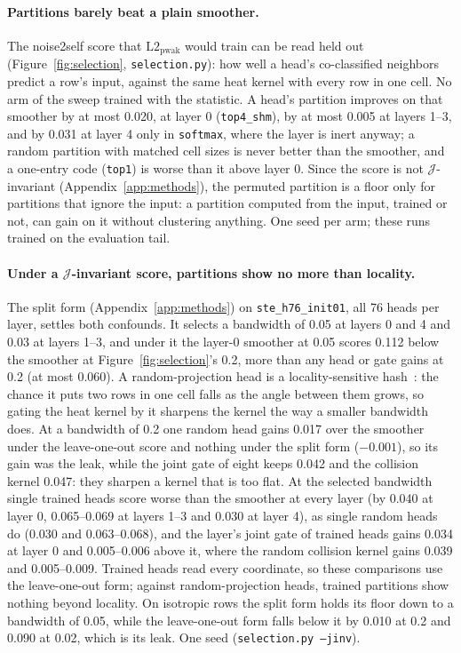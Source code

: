 \paragraph{Partitions barely beat a plain smoother.} The noise2self score
that $\mathrm{L2}_{\mathrm{pwak}}$ would train can be read held out
(Figure~\ref{fig:selection}, \texttt{selection.py}): how well a head's
co-classified neighbors predict a row's input, against the same heat
kernel with every row in one cell. No arm of the sweep trained with the
statistic. A head's partition improves on that smoother by at most 0.020,
at layer 0 (\texttt{top4\_shm}), by at most 0.005 at layers 1--3, and by
0.031 at layer 4 only in \texttt{softmax}, where the layer is inert
anyway; a random partition with matched cell sizes is never better than
the smoother, and a one-entry code (\texttt{top1}) is worse than it above
layer 0. Since the score is not $\mathcal{J}$-invariant (Appendix~\ref{app:methods}),
the permuted partition is a floor only for partitions that ignore the
input: a partition computed from the input, trained or not, can gain on
it without clustering anything. One seed per arm; these runs trained on
the evaluation tail.

\paragraph{Under a $\mathcal{J}$-invariant score, partitions show no more
than locality.} The split form (Appendix~\ref{app:methods}) on
\texttt{ste\_h76\_init01}, all 76 heads per layer, settles both
confounds. It selects a bandwidth of 0.05 at layers 0 and 4 and 0.03 at
layers 1--3, and under it the layer-0 smoother at 0.05 scores 0.112
below the smoother at Figure~\ref{fig:selection}'s 0.2, more than any
head or gate gains at 0.2 (at most 0.060). A random-projection head is a
locality-sensitive hash~\cite{harpeled2012}: the chance it puts two rows
in one cell falls as the angle between them grows, so gating the heat
kernel by it sharpens the kernel the way a smaller bandwidth does. At a
bandwidth of 0.2 one random head gains 0.017 over the smoother under the
leave-one-out score and nothing under the split form ($-0.001$), so its
gain was the leak, while the joint gate of eight keeps 0.042 and the
collision kernel 0.047: they sharpen a kernel that is too flat. At the
selected bandwidth single trained heads score worse than the smoother at
every layer (by 0.040 at layer 0, 0.065--0.069 at layers 1--3 and 0.030
at layer 4), as single random heads do (0.030 and 0.063--0.068), and the
layer's joint gate of trained heads gains 0.034 at layer 0 and
0.005--0.006 above it, where the random collision kernel gains 0.039 and
0.005--0.009. Trained heads read every coordinate, so these comparisons
use the leave-one-out form; against random-projection heads, trained
partitions show nothing beyond locality. On isotropic rows the split
form holds its floor down to a bandwidth of 0.05, while the
leave-one-out form falls below it by 0.010 at 0.2 and 0.090 at 0.02,
which is its leak. One seed (\texttt{selection.py --jinv}).

